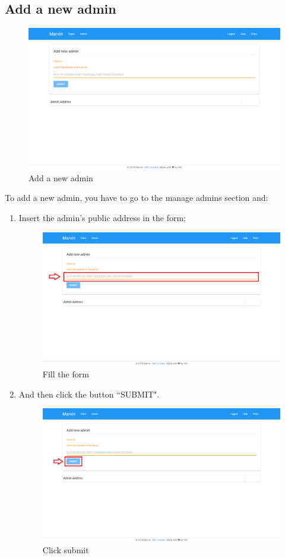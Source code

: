 \documentclass[ManualeUtente]{subfiles}
\begin{document}
	\subsection{Add a new admin}
	\begin{figure}[H]
		\centering
		\includegraphics[width=0.7\linewidth]{image/UniversityAddAmin}
		\caption[Add admin]{Add a new admin}
		\label{fig:Add a new admin}
	\end{figure}\newpage
	To add a new admin, you have to go to the manage admins section and:
	\begin{enumerate}
		\item Insert the admin's public address in the form;
		\begin{figure}[H]
			\centering
			\includegraphics[width=0.7\linewidth]{image/UniversityAddAmin1}
			\caption[Add admin form]{Fill the form}
			\label{fig:Add a new admin, fill the form}
		\end{figure}
		\item And then click the button ``SUBMIT".
		\begin{figure}[H]
			\centering
			\includegraphics[width=0.7\linewidth]{image/UniversityAddAmin2}
			\caption[Add admin submit]{Click submit}
			\label{fig:Add a new admin, click submit}
		\end{figure}
	\end{enumerate}
	\newpage
\end{document}
